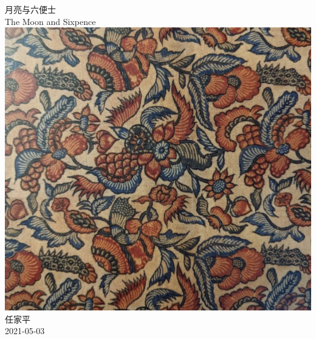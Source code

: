 \documentclass[a4paper, 12pt]{article}
\begin{document}
\begin{center}
    {\Huge 
        月亮与六便士 }\\[12pt]
    {\huge 
        The Moon and Sixpence}\\[20pt]
    
    \includegraphics[scale=0.8]{figure/cover.jpg} 
    \\[20pt] 

    {\Large 
        任家平\\[12pt]
        2021-05-03}
\end{center}
\thispagestyle{empty}



\newpage
{}
\tableofcontents
\newpage
{}



\end{document}
